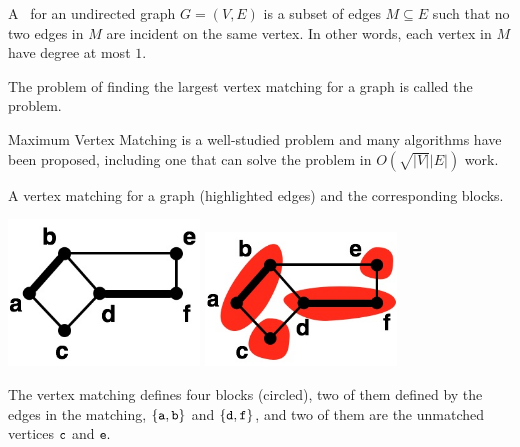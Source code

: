 \begin{flex}
\begin{definition}
\label{def:graphcon::edge::vertex-matching}
A~ for an undirected graph $G = (V,E)$ is a
subset of edges $M \subseteq E$ such that no two edges in $M$ are
incident on the same vertex. In other words, each vertex in $M$ have
degree at most $1$. 

The problem of finding the largest vertex matching for a graph is
called the~ problem.  
\end{definition}

\begin{gram}
Maximum Vertex Matching is a well-studied problem and many algorithms
have been proposed, including one that can solve the problem in
$O(\sqrt{|V|}|E|)$ work.
\end{gram}


\begin{example}
\label{ex:graphcon::edge::vertex-matching}
A vertex matching for a graph (highlighted edges) and the
corresponding blocks.
\begin{center}
  \includegraphics[width=2in]{./graph-contraction/media-edge/matching-example.jpg}
\hspace{1in}
  \includegraphics[width=2in]{./graph-contraction/media-edge/matching-example-partitioned.jpg}
\end{center}

The vertex matching defines four blocks (circled), two of them defined
by the edges in the matching, $\left\{ \texttt{a},\texttt{b} \right\}$ and
$\left\{ \texttt{d},\texttt{f} \right\}$, and two of them are the unmatched
vertices $\texttt{c}$ and $\texttt{e}.$
\end{example}
\end{flex}

